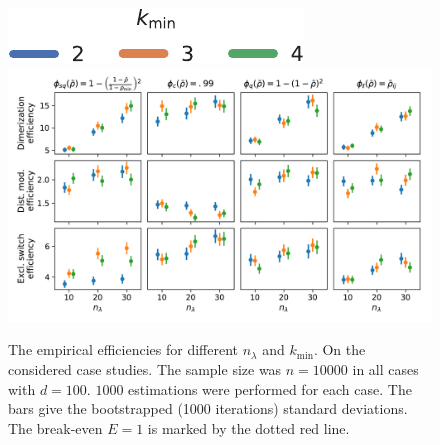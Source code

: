 \begin{figure}[htb]
    \centering    
    \includegraphics[scale=.55]{gfx/legend_horiz.pdf}\\
    \includegraphics[scale=.4]{gfx/efficiency_pminfrac.pdf}
	\caption[Varying redundancy heuristics and $k_{\min}$]{The empirical efficiencies for different $n_\lambda$ and $k_{\min}$.
	On the considered case studies. The sample size was $n=\num{10000}$ in all cases
    with $d=100$.
	$\num{1000}$ estimations were performed for each case.
    The bars give the 
	bootstrapped (\num{1000} iterations) standard deviations.
    The break-even $E=1$ is marked by the dotted red line.\label{fig:efficiencies_alg_params}}
\end{figure}



